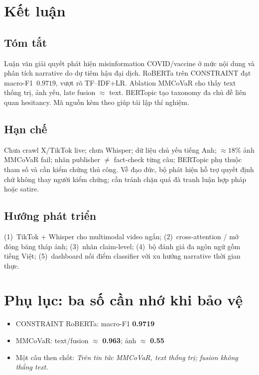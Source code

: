 \documentclass[12pt, a4paper]{report}
\begin{document}
\chapter{Kết luận}
\label{chap:conclusion}

\section{Tóm tắt}
\label{sec:summary}

Luận văn giải quyết phát hiện misinformation COVID/vaccine ở mức nội dung và phân tích narrative do dự tiêm hậu đại dịch.
RoBERTa trên CONSTRAINT đạt macro-F1~$0.9719$, vượt rõ TF--IDF+LR.
Ablation MMCoVaR cho thấy text thống trị, ảnh yếu, late fusion $\approx$ text.
BERTopic tạo taxonomy đa chủ đề liên quan hesitancy.
Mã nguồn kèm theo giúp tái lập thí nghiệm.

\section{Hạn chế}
\label{sec:limitations}

Chưa crawl X/TikTok live; chưa Whisper; dữ liệu chủ yếu tiếng Anh; $\approx 18\%$ ảnh MMCoVaR fail; nhãn publisher $\neq$ fact-check từng câu; BERTopic phụ thuộc tham số và cần kiểm chứng thủ công.
Về đạo đức, bộ phát hiện hỗ trợ quyết định chứ không thay người kiểm chứng; cần tránh chặn quá đà tranh luận hợp pháp hoặc satire.

\section{Hướng phát triển}
\label{sec:future-work}

(1)~TikTok + Whisper cho multimodal video ngắn;
(2)~cross-attention / mở đóng băng tháp ảnh;
(3)~nhãn claim-level;
(4)~bộ đánh giá đa ngôn ngữ gồm tiếng Việt;
(5)~dashboard nối điểm classifier với xu hướng narrative thời gian thực.

\clearpage
{}
\printbibliography[title=Tài liệu tham khảo]

\appendix
\chapter{Phụ lục: ba số cần nhớ khi bảo vệ}
\begin{itemize}
  \item CONSTRAINT RoBERTa: macro-F1 \textbf{0.9719}
  \item MMCoVaR: text/fusion $\approx$ \textbf{0.963}; ảnh $\approx$ \textbf{0.55}
  \item Một câu then chốt: \emph{Trên tin tức MMCoVaR, text thống trị; fusion không thắng text.}
\end{itemize}
\end{document}
